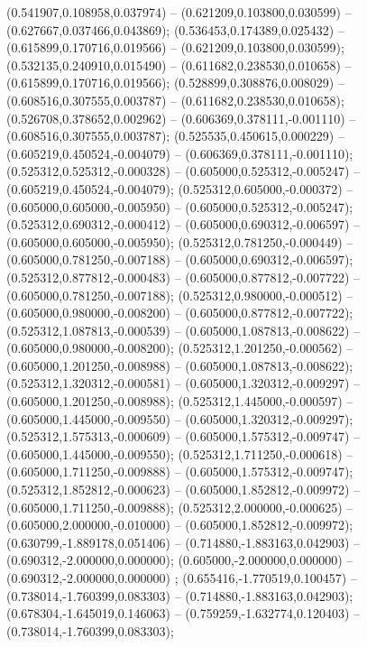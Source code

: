  (0.541907,0.108958,0.037974) -- (0.621209,0.103800,0.030599) -- (0.627667,0.037466,0.043869);
 (0.536453,0.174389,0.025432) -- (0.615899,0.170716,0.019566) -- (0.621209,0.103800,0.030599);
 (0.532135,0.240910,0.015490) -- (0.611682,0.238530,0.010658) -- (0.615899,0.170716,0.019566);
 (0.528899,0.308876,0.008029) -- (0.608516,0.307555,0.003787) -- (0.611682,0.238530,0.010658);
 (0.526708,0.378652,0.002962) -- (0.606369,0.378111,-0.001110) -- (0.608516,0.307555,0.003787);
 (0.525535,0.450615,0.000229) -- (0.605219,0.450524,-0.004079) -- (0.606369,0.378111,-0.001110);
 (0.525312,0.525312,-0.000328) -- (0.605000,0.525312,-0.005247) -- (0.605219,0.450524,-0.004079);
 (0.525312,0.605000,-0.000372) -- (0.605000,0.605000,-0.005950) -- (0.605000,0.525312,-0.005247);
 (0.525312,0.690312,-0.000412) -- (0.605000,0.690312,-0.006597) -- (0.605000,0.605000,-0.005950);
 (0.525312,0.781250,-0.000449) -- (0.605000,0.781250,-0.007188) -- (0.605000,0.690312,-0.006597);
 (0.525312,0.877812,-0.000483) -- (0.605000,0.877812,-0.007722) -- (0.605000,0.781250,-0.007188);
 (0.525312,0.980000,-0.000512) -- (0.605000,0.980000,-0.008200) -- (0.605000,0.877812,-0.007722);
 (0.525312,1.087813,-0.000539) -- (0.605000,1.087813,-0.008622) -- (0.605000,0.980000,-0.008200);
 (0.525312,1.201250,-0.000562) -- (0.605000,1.201250,-0.008988) -- (0.605000,1.087813,-0.008622);
 (0.525312,1.320312,-0.000581) -- (0.605000,1.320312,-0.009297) -- (0.605000,1.201250,-0.008988);
 (0.525312,1.445000,-0.000597) -- (0.605000,1.445000,-0.009550) -- (0.605000,1.320312,-0.009297);
 (0.525312,1.575313,-0.000609) -- (0.605000,1.575312,-0.009747) -- (0.605000,1.445000,-0.009550);
 (0.525312,1.711250,-0.000618) -- (0.605000,1.711250,-0.009888) -- (0.605000,1.575312,-0.009747);
 (0.525312,1.852812,-0.000623) -- (0.605000,1.852812,-0.009972) -- (0.605000,1.711250,-0.009888);
 (0.525312,2.000000,-0.000625) -- (0.605000,2.000000,-0.010000) -- (0.605000,1.852812,-0.009972);
 (0.630799,-1.889178,0.051406) -- (0.714880,-1.883163,0.042903) -- (0.690312,-2.000000,0.000000);
 (0.605000,-2.000000,0.000000) -- (0.690312,-2.000000,0.000000) ;
 (0.655416,-1.770519,0.100457) -- (0.738014,-1.760399,0.083303) -- (0.714880,-1.883163,0.042903);
 (0.678304,-1.645019,0.146063) -- (0.759259,-1.632774,0.120403) -- (0.738014,-1.760399,0.083303);
